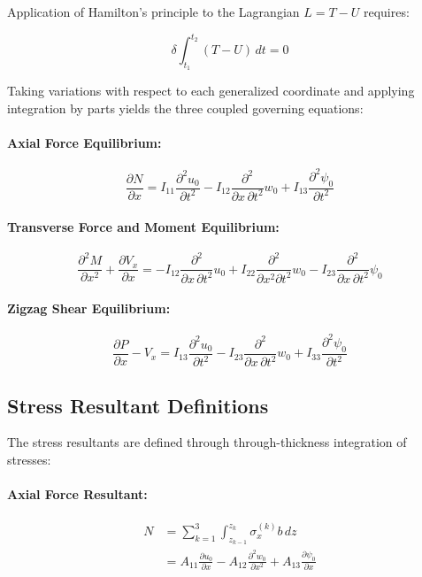 \documentclass[12pt,a4paper]{report}
\begin{document}
Application of Hamilton's principle to the Lagrangian $L = T - U$ requires:

\begin{equation}
\delta \int_{t_1}^{t_2} (T - U) \, dt = 0
\end{equation}

Taking variations with respect to each generalized coordinate and applying integration by parts yields the three coupled governing equations:

\paragraph{Axial Force Equilibrium:}
\begin{equation}
\frac{\partial N}{\partial x} 
= I_{11} \frac{\partial^2 u_0}{\partial t^2} 
- I_{12} \frac{\partial^2}{\partial x \, \partial t^2} w_0 
+ I_{13} \frac{\partial^2 \psi_0}{\partial t^2}
\end{equation}

\paragraph{Transverse Force and Moment Equilibrium:}
\begin{equation}
\frac{\partial^2 M}{\partial x^2} + \frac{\partial V_x}{\partial x} 
= -I_{12} \frac{\partial^2}{\partial x \, \partial t^2} u_0 
+ I_{22} \frac{\partial^2}{\partial x^2 \partial t^2} w_0 
- I_{23} \frac{\partial^2}{\partial x \, \partial t^2} \psi_0
\end{equation}

\paragraph{Zigzag Shear Equilibrium:}
\begin{equation}
\frac{\partial P}{\partial x} - V_x 
= I_{13} \frac{\partial^2 u_0}{\partial t^2} 
- I_{23} \frac{\partial^2}{\partial x \, \partial t^2} w_0 
+ I_{33} \frac{\partial^2 \psi_0}{\partial t^2}
\end{equation}

\subsection*{Stress Resultant Definitions}

The stress resultants are defined through through-thickness integration of stresses:

\paragraph{Axial Force Resultant:}
\begin{align}
N &= \sum_{k=1}^{3} \int_{z_{k-1}}^{z_k} \sigma_x^{(k)} b \, dz \nonumber \\
  &= A_{11} \frac{\partial u_0}{\partial x} 
   - A_{12} \frac{\partial^2 w_0}{\partial x^2} 
   + A_{13} \frac{\partial \psi_0}{\partial x}
\end{align}
\end{document}
